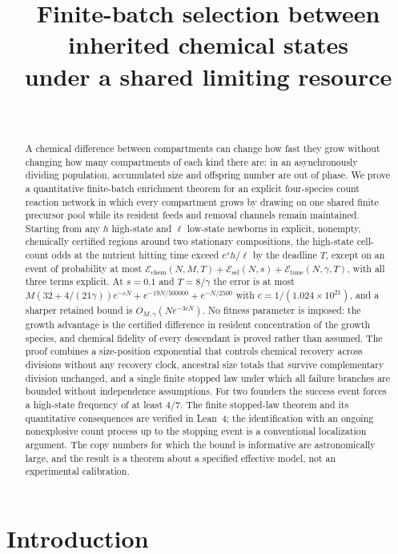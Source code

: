 \documentclass[11pt,a4paper]{article}
\title{Finite-batch selection between inherited chemical states\\under a shared limiting resource}
\author{\PaperAuthor\\[2pt]\small\PaperAffiliation}
\date{\PaperDate}
\theoremstyle{plain}
\theoremstyle{definition}
\theoremstyle{remark}
\newcommand{\chem}{\mathcal E_{\mathrm{chem}}}
\newcommand{\Esel}{\mathcal E_{\mathrm{sel}}}
\newcommand{\Etime}{\mathcal E_{\mathrm{time}}}
\begin{document}
\maketitle

\begin{abstract}
A chemical difference between compartments can change how fast they grow without changing how many compartments of each kind there are: in an asynchronously dividing population, accumulated size and offspring number are out of phase. We prove a quantitative finite-batch enrichment theorem for an explicit four-species count reaction network in which every compartment grows by drawing on one shared finite precursor pool while its resident feeds and removal channels remain maintained. Starting from any $h$ high-state and $\ell$ low-state newborns in explicit, nonempty, chemically certified regions around two stationary compositions, the high-state cell-count odds at the nutrient hitting time exceed $e^{s}h/\ell$ by the deadline $T$, except on an event of probability at most $\chem(N,M,T)+\Esel(N,s)+\Etime(N,\gamma,T)$, with all three terms explicit. At $s=0.1$ and $T=8/\gamma$ the error is at most $M(32+4/(21\gamma))e^{-cN}+e^{-19N/500000}+e^{-N/2500}$ with $c=1/(1.024\times10^{21})$, and a sharper retained bound is $O_{M,\gamma}(Ne^{-3cN})$. No fitness parameter is imposed: the growth advantage is the certified difference in resident concentration of the growth species, and chemical fidelity of every descendant is proved rather than assumed. The proof combines a size-position exponential that controls chemical recovery across divisions without any recovery clock, ancestral size totals that survive complementary division unchanged, and a single finite stopped law under which all failure branches are bounded without independence assumptions. For two founders the success event forces a high-state frequency of at least $4/7$. The finite stopped-law theorem and its quantitative consequences are verified in Lean~4; the identification with an ongoing nonexplosive count process up to the stopping event is a conventional localization argument. The copy numbers for which the bound is informative are astronomically large, and the result is a theorem about a specified effective model, not an experimental calibration.
\end{abstract}

\section{Introduction}\label{sec:intro}
\end{document}
